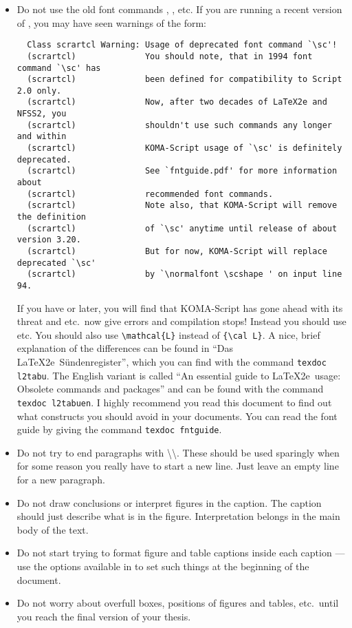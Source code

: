 \begin{itemize}
\item Do not use the old font commands , ,  etc.
  If you are running a recent version of \TeXLive, you may have seen warnings of the form:
  \begin{verbatim}
  Class scrartcl Warning: Usage of deprecated font command `\sc'!
  (scrartcl)              You should note, that in 1994 font command `\sc' has
  (scrartcl)              been defined for compatibility to Script 2.0 only.
  (scrartcl)              Now, after two decades of LaTeX2e and NFSS2, you
  (scrartcl)              shouldn't use such commands any longer and within
  (scrartcl)              KOMA-Script usage of `\sc' is definitely deprecated.
  (scrartcl)              See `fntguide.pdf' for more information about
  (scrartcl)              recommended font commands.
  (scrartcl)              Note also, that KOMA-Script will remove the definition
  (scrartcl)              of `\sc' anytime until release of about version 3.20.
  (scrartcl)              But for now, KOMA-Script will replace deprecated `\sc'
  (scrartcl)              by `\normalfont \scshape ' on input line 94.
  \end{verbatim}
  If you have  or later, you will find that KOMA-Script has gone ahead with its threat 
  and  etc.\ now give errors and compilation stops!
  Instead you should use  etc.
  You should also use \verb|\mathcal{L}| instead of \verb|{\cal L}|.
  A nice, brief explanation of the differences can be found in \foreignlanguage{ngerman}{\enquote{Das \LaTeX2e\ Sündenregister}},
  which you can find with the command \texttt{texdoc l2tabu}.
  The English variant is called \enquote{An essential guide to \LaTeX2e\ usage: Obsolete commands and packages}
  and can be found with the command \texttt{texdoc l2tabuen}.
  I highly recommend you read this document to find out what constructs you should avoid in your documents.
  You can read the font guide by giving the command \texttt{texdoc fntguide}.
  
\item Do not try to end paragraphs with
  \textbackslash\textbackslash. These should be used sparingly when
  for some reason you really have to start a new line. Just leave an
  empty line for a new paragraph.
  
\item Do not draw conclusions or interpret figures in the caption. The
  caption should just describe what is in the figure. Interpretation
  belongs in the main body of the text.
  
\item Do not start trying to format figure and table captions inside
  each caption --- use the options available in \KOMAScript{} to set
  such things at the beginning of the document.
  
\item Do not worry about overfull boxes, positions of figures
  and tables, etc.\ until you reach the final version of your thesis.
\end{itemize}



